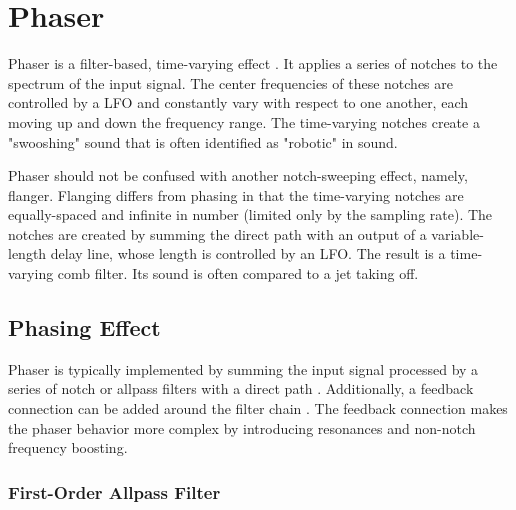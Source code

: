 
\chapter{Phaser}
\label{chap:phaser}
Phaser is a filter-based, time-varying effect \cite{Zoelzer2011}. It applies a series of notches to the spectrum of the input signal. The center frequencies of these notches are controlled by a \ac{LFO} and constantly vary with respect to one another, each moving up and down the frequency range. The time-varying notches create a "swooshing" sound that is often identified as "robotic" in sound.

Phaser should not be confused with another notch-sweeping effect, namely, flanger. Flanging differs from phasing in that the time-varying notches are equally-spaced and infinite in number (limited only by the sampling rate). The notches are created by summing the direct path with an output of a variable-length delay line, whose length is controlled by an \ac{LFO}. The result is a time-varying comb filter. Its sound is often compared to a jet taking off.


\section{Phasing Effect}
\label{sec:phasing_effect}

\begin{figure}
    \centering
    
\end{figure}

Phaser is typically implemented by summing the input signal processed by a series of notch or allpass filters with a direct path \cite{Zoelzer2011}. Additionally, a feedback connection can be added around the filter chain \cite{Kiiski2016}. The feedback connection makes the phaser behavior more complex by introducing resonances and non-notch frequency boosting.

\subsection{First-Order Allpass Filter}

